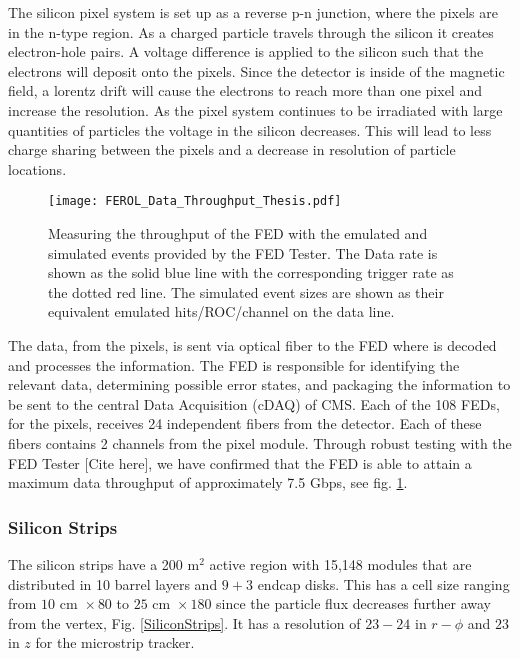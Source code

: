 The silicon pixel system is set up as a reverse p-n junction, where the pixels are in the n-type region. As a charged particle travels through the silicon it creates electron-hole pairs. A voltage difference is applied to the silicon such that the electrons will deposit onto the pixels. Since the detector is inside of the magnetic field, a lorentz drift will cause the electrons to reach more than one pixel and increase the resolution. As the pixel system continues to be irradiated with large quantities of particles the voltage in the silicon decreases. This will lead to less charge sharing between the pixels and a decrease in resolution of particle locations. 

\begin{figure}
 	\centering
	\texttt{[image: FEROL\_Data\_Throughput\_Thesis.pdf]}
 	\caption[FED Throughput]{Measuring the throughput of the FED with the emulated and simulated events provided by the FED Tester. The Data rate is shown as the solid blue line with the corresponding trigger rate as the dotted red line. The simulated event sizes are shown as their equivalent emulated hits/ROC/channel on the data line.}
 	\label{FEDThroughput} 
\end{figure}

The data, from the pixels, is sent via optical fiber to the FED where is decoded and processes the information. The FED is responsible for identifying the relevant data, determining possible error states, and packaging the information to be sent to the central Data Acquisition (cDAQ) of CMS. Each of the 108 FEDs, for the pixels, receives 24 independent fibers from the detector. Each of these fibers contains 2 channels from the pixel module. Through robust testing with the FED Tester [Cite here], we have confirmed that the FED is able to attain a maximum data throughput of approximately 7.5 Gbps, see fig. \ref{FEDThroughput}. 

\subsubsection{Silicon Strips}
\label{subsec:Strips}

The silicon strips have a 200 m$^2$ active region with 15,148 modules that are distributed in 10 barrel layers and $9+3$ endcap disks.
This has a cell size ranging from $10 \text{ cm } \times80$ \mum{} to $25 \text{ cm } \times 180$ \mum{} since the particle flux decreases further away from the vertex, Fig. \ref{SiliconStrips}. It has a resolution of $23-24$ \mum{} in $r-\phi$ and $23$ \mum{} in $z$ for the microstrip tracker.

